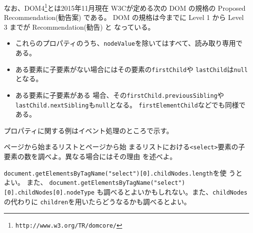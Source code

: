 なお、DOM4\footnote{\texttt{http://www.w3.org/TR/domcore/}}とは2015年11月現在
W3Cが定める次の DOM の規格の Proposed Recommendation(勧告案) である。
DOM の規格は今までに Level 1 から Level 3 までが Recommendation(勧告) と
なっている。
\begin{itemize}
 \item これらのプロパティのうち、\texttt{nodeValue}を除いてはすべて、読み取り専用である。
 \item ある要素に子要素がない場合にはその要素の\texttt{firstChild}や
\texttt{lastChild}は\texttt{null}となる。
 \item ある要素に子要素がある
場合、その\texttt{firstChild.previousSibling}や
\texttt{lastChild.nextSibling}も\texttt{null}となる。
       \texttt{firstElementChild}などでも同様である。
\end{itemize}

プロパティに関する例はイベント処理のところで示す。
\begin{Prob}\upshape
 \pageref{pulldown1}ページから始まるリストと\pageref{pulldown2}ページから始
 まるリストにおける\texttt{<select>}要素の子要素の数を調べよ。異なる場合にはその理由
 を述べよ。

 \texttt{document.getElementsByTagName("select")[0].childNodes.length}を使
 うとよい。
%
また、
 \texttt{document.getElementsByTagName("select")[0].childNodes[0].nodeType}
 も調べるとよいかもしれない。また、\texttt{childNodes}の代わりに
 \texttt{children}を用いたらどうなるかも調べるとよい。
\end{Prob}

